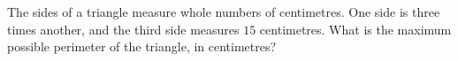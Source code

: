 The sides of a triangle measure whole numbers of centimetres. One side is three times another, and the third side measures $15$ centimetres. What is the maximum possible perimeter of the triangle, in centimetres?

